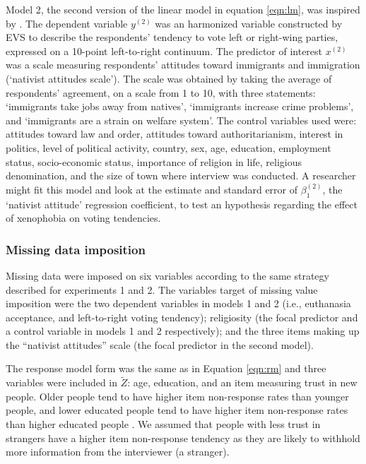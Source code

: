 	Model 2, the second version of the linear model in equation \ref{eqn:lm}, was inspired by \cite{immerzeel:2015}.
	The dependent variable $y^{(2)}$ was an harmonized variable constructed by EVS to describe the respondents' 
	tendency to vote left or right-wing parties, expressed on a 10-point left-to-right continuum.
	The predictor of interest $x^{(2)}$ was a scale measuring respondents' attitudes toward immigrants and immigration 
	(`nativist attitudes scale').
	The scale was obtained by taking the average of respondents' agreement, on a scale from 1 to 10, with three 
	statements: `immigrants take jobs away from natives', `immigrants increase crime problems', and 
	`immigrants are a strain on welfare system'.
	The control variables used were: 
	attitudes toward law and order, attitudes toward authoritarianism, interest in politics, level of political activity,  
	country, sex, age, education, employment status, socio-economic status, importance of religion in life, 
	religious denomination, and the size of town where interview was conducted.
	A researcher might fit this model and look at the estimate and standard error of $\beta^{(2)}_{1}$, 
	the `nativist attitude' regression coefficient, to test an hypothesis regarding the effect of xenophobia on voting 
	tendencies.

\subsubsection{Missing data imposition}

	Missing data were imposed on six variables according to the same strategy described for experiments 1 and 2.
	The variables target of missing value imposition were the two dependent variables in models 1 and 2 (i.e., 
	euthanasia acceptance, and left-to-right voting tendency); 
	religiosity (the focal predictor and a control variable in models 1 and 2 respectively);
	and the three items making up the ``nativist attitudes'' scale (the focal predictor in the second model).

	The response model form was the same as in Equation \eqref{eqn:rm} and three variables were included in $\tilde{Z}$: 
	age, education, and an item measuring trust in new people. 
	Older people tend to have higher item non-response rates than younger people, and 
	lower educated people tend to have higher item non-response rates than higher educated people 
	\citep{guadagnoliCleary:1992, leeuwEtAl:2003}.
	We assumed that people with less trust in strangers have a higher item non-response tendency as 
	they are likely to withhold more information from the interviewer (a stranger).

